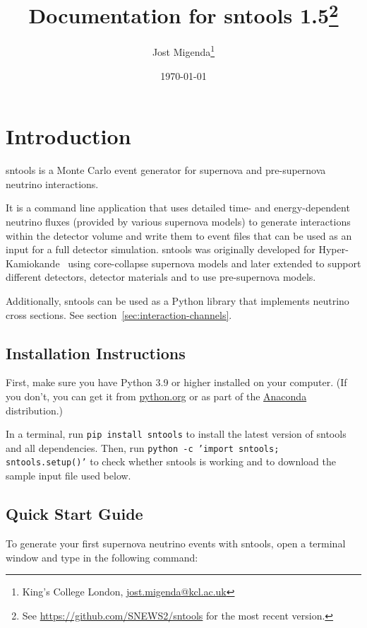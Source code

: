 \documentclass[11pt, oneside]{article}
\title{Documentation for sntools 1.5\footnote{See \url{https://github.com/SNEWS2/sntools} for the most recent version.}}
\author{Jost Migenda\footnote{King’s College London, \url{jost.migenda@kcl.ac.uk}}}
\date{\today}
\begin{document}
\maketitle
\setcounter{tocdepth}{2}
\tableofcontents
\clearpage


\section{Introduction}

sntools is a Monte Carlo event generator for supernova and pre-supernova neutrino interactions.

It is a command line application that uses detailed time- and energy-dependent neutrino fluxes (provided by various supernova models) to generate interactions within the detector volume and write them to event files that can be used as an input for a full detector simulation.
sntools was originally developed for Hyper-Kamiokande~\cite{Migenda2019} using core-collapse supernova models and later extended to support different detectors, detector materials and to use pre-supernova models.

Additionally, sntools can be used as a Python library that implements neutrino cross sections. See section~\ref{sec:interaction-channels}.

\subsection{Installation Instructions}

First, make sure you have Python 3.9 or higher installed on your computer.
(If you don’t, you can get it from \href{https://www.python.org}{python.org} or as part of the \href{https://www.anaconda.com/products/individual}{Anaconda} distribution.)

In a terminal, run \texttt{pip install sntools} to install the latest version of sntools and all dependencies.
Then, run \texttt{python -c 'import sntools; sntools.setup()'} to check whether sntools is working and to download the sample input file used below.


\subsection{Quick Start Guide}

To generate your first supernova neutrino events with sntools, open a terminal window and type in the following command:
\end{document}
